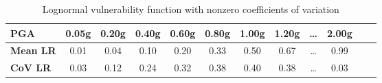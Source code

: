 \begin{table}[htbp]

\centering
\begin{tabular}{ l c c c c c c c c c c c}

\hline
\rowcolor{anti-flashwhite}
\bf{PGA} & \bf{0.05g} & \bf{0.20g} & \bf{0.40g} & \bf{0.60g} & \bf{0.80g} & \bf{1.00g} & \bf{1.20g} & \bf{\dots} & \bf{2.00g} \\
\hline
\bf{Mean LR} & 0.01 & 0.04 & 0.10 & 0.20 & 0.33 & 0.50 & 0.67 & \dots & 0.99 \\
\bf{CoV LR} & 0.03 & 0.12 & 0.24 & 0.32 & 0.38 & 0.40 & 0.38 & \dots & 0.03 \\
\hline
\end{tabular}

\caption{Lognormal vulnerability function with nonzero coefficients of variation}
\label{tab:vf-ln-tax1-nzcov}
\end{table}